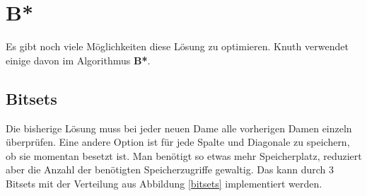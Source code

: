 \section{B*}
Es gibt noch viele Möglichkeiten diese Lösung zu optimieren. Knuth verwendet einige davon im Algorithmus \textbf{B*}\cite[p. 4]{TAOCP}.
\subsection{Bitsets}
Die bisherige Lösung muss bei jeder neuen Dame alle vorherigen Damen einzeln überprüfen. Eine 
andere Option ist für jede Spalte und Diagonale zu speichern, ob sie momentan besetzt ist.
Man benötigt so etwas mehr Speicherplatz, reduziert aber die Anzahl der benötigten Speicherzugriffe gewaltig. 
Das kann durch 3 Bitsets mit der Verteilung aus Abbildung \ref{bitsets} implementiert werden.
